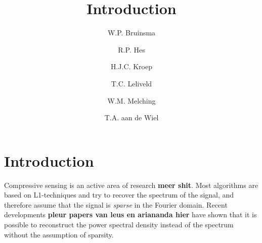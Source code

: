 \documentclass[a4paper, openany, oneside]{memoir}
\title{Introduction}
\author{W.P. Bruinsma \and R.P. Hes \and H.J.C. Kroep \and T.C. Leliveld \and W.M. Melching \and T.A. aan de Wiel}
\begin{document}
\section{Introduction}
Compressive sensing is an active area of research \textbf{meer shit}. Most algorithms are based on L1-techniques and try to recover the spectrum of the signal, and therefore assume that the signal is \emph{sparse} in the Fourier domain. Recent developments \textbf{pleur papers van leus en ariananda hier} have shown that it is possible to reconstruct the power spectral density instead of the spectrum without the assumption of sparsity.
\end{document}
